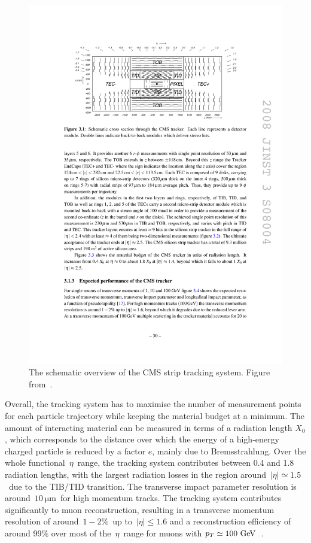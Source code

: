 \begin{figure}
\begin{centering}
\includegraphics[width=1.0\textwidth]{figures/exp/tracker.pdf}
\caption[The CMS strip tracker]{The schematic overview of the CMS strip tracking system. Figure from~\cite{Chatrchyan:2008aa}.}
\label{fig:cms_tracker}
\end{centering}
\end{figure}

Overall, the tracking system has to maximise the number of measurement points for each particle trajectory while keeping the material budget at a minimum. The amount of interacting material can be measured in terms of a radiation length $X_0$, which corresponds to the distance over which the energy of a high-energy charged particle is reduced by a factor $e$, mainly due to Bremsstrahlung. Over the whole functional~$\eta$~range, the tracking system contributes between 0.4 and 1.8 radiation lengths, with the largest radiation losses in the region around~$|\eta| \simeq 1.5$~due to the TIB/TID transition. The transverse impact parameter resolution is around~$10~\mathrm{\mu m}$~for high momentum tracks. The tracking system contributes significantly to muon reconstruction, resulting in a transverse momentum resolution of around~$1-2\%$~up to~$|\eta| \leq 1.6$ and a reconstruction efficiency of around 99\% over most of the~$\eta$~range for muons with $p_T \simeq 100~\mathrm{GeV}$~\cite{Chatrchyan:2008aa,CMS-DP-2017-007}. 

